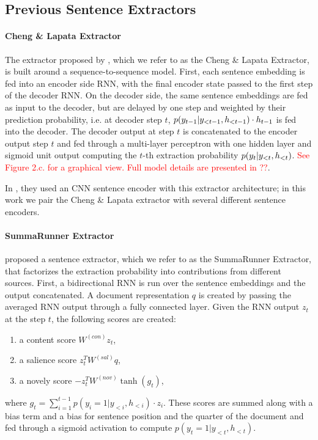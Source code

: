 \subsection{Previous Sentence Extractors}

\paragraph{Cheng \& Lapata Extractor} The extractor proposed by 
\citet{cheng2016neural}, which we refer to as the Cheng \& Lapata Extractor,
is built around a sequence-to-sequence model.
First, each sentence embedding is
fed into an encoder side RNN, with the final encoder state passed to the
first step of the decoder RNN. On the decoder side, the same sentence 
embeddings are fed as input to the decoder, but are delayed by one step and 
weighted by their prediction probability, i.e. at decoder step $t$,
$p(\slabel[t-1]|\slabel[<t-1], \sentEmb[<t-1]) \cdot \sentEmb[t-1]$
is fed into the decoder. The decoder output at step $t$ is concatenated 
to the encoder output step $t$ and fed through a multi-layer perceptron
with one hidden layer and sigmoid unit output computing the $t$-th
extraction probability $p(\slabel[t]|\slabel[<t], \sentEmb[<t])$. \textcolor{red}{See Figure 2.c. for a graphical view. Full model details are presented in ??}.

In \cite{cheng2016neural}, they used an CNN sentence encoder with 
this extractor architecture; in this work we pair the Cheng \& Lapata extractor
with several different sentence encoders.



\paragraph{SummaRunner Extractor} \citet{nallapati2017summarunner} proposed
a sentence extractor, which we refer to as the SummaRunner Extractor,
that factorizes the extraction probability into contributions 
from different sources.
First, a bidirectional RNN is run over the sentence embeddings and the output
concatenated. A document representation $q$ is created by passing the 
averaged RNN output through a fully connected layer. 
Given the RNN output $z_t$ at the step $t$, the following scores are created:
\begin{enumerate}
\item a content score $W^{(con)}z_t$,
\item a salience score $z_t^TW^{(sal)}q$,
\item a novely score $-z_t^TW^{(nov)}\tanh(g_t)$,
\end{enumerate}
where $g_t = \sum_{i=1}^{t-1} p(y_i=1|y_{<i}, h_{<i}) \cdot z_i$.
These scores are summed along with a bias term and a bias for sentence 
position and the quarter of the document and fed through a sigmoid activation
to compute $p(y_t=1|y_{<t}, h_{<t})$.

